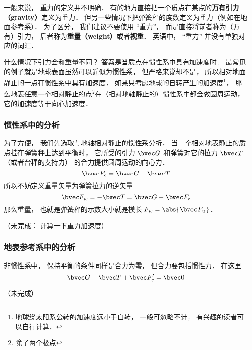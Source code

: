 

一般来说， 重力的定义并不明确． 有的地方直接把一个质点在某点的\textbf{万有引力（gravity）}定义为重力． 但另一些情况下把弹簧秤的度数定义为重力（例如在地面参考系）． 为了区分， 我们建议不要使用 “重力”， 而是直接将前者称为（万有）引力， 后者称为\textbf{重量（weight）}或者\textbf{视重}． 英语中， “重力” 并没有单独对应的词汇．

什么情况下引力会和重量不同？ 答案是当质点在惯性系中具有加速度时． 最常见的例子就是地球表面虽然可以近似为惯性系， 但严格来说却不是， 所以相对地面静止的一点在惯性系中具有加速度． 如果只考虑地球的自转产生的加速度\footnote{地球绕太阳系公转的加速度远小于自转， 一般可忽略不计， 有兴趣的读者可以自行计算．}， 那么地表任意一个相对静止的点\footnote{除了两个极点}在（相对地轴静止的）惯性系中都会做圆周运动， 它的加速度等于向心加速度．

\subsubsection{惯性系中的分析}
为了方便， 我们先选取与地轴相对静止的惯性系分析． 当一个相对地表静止的质点挂在弹簧秤上达到平衡时， 它所受的引力 $\bvec G$ 和弹簧对它的拉力 $\bvec T$（或者台秤的支持力） 的合力提供圆周运动的向心力．
\begin{equation}
\bvec F_c = \bvec G + \bvec T
\end{equation}
所以不妨定义重量矢量为弹簧拉力的逆矢量
\begin{equation}
\bvec F_w = -\bvec T = \bvec G - \bvec F_c
\end{equation}
那么重量， 也就是弹簧秤的示数大小就是模长 $F_w = \abs{\bvec F_w}$．

（未完成： 计算一下重力加速度）

\subsubsection{地表参考系中的分析}
非惯性系中， 保持平衡的条件同样是合力为零， 但合力要包括惯性力． 在这里
\begin{equation}
\bvec G + \bvec T + \bvec F'_c = \bvec 0
\end{equation}


（未完成）

